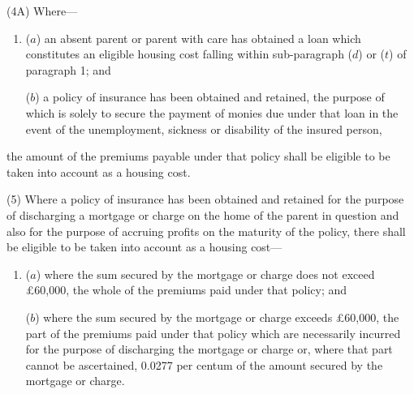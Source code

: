 \documentclass[12pt,a4paper]{article}
\begin{document}
(4A) Where—
\begin{enumerate}\item[]
($a$) an absent parent or parent with care has obtained a loan which constitutes an eligible housing cost falling within sub-paragraph ($d$) or ($t$) of paragraph 1; and

($b$) a policy of insurance has been obtained and retained, the purpose of which is solely to secure the payment of monies due under that loan in the event of the unemployment, sickness or disability of the insured person,
\end{enumerate}
the amount of the premiums payable under that policy shall be eligible to be taken into account as a housing cost.


(5) Where a policy of insurance has been obtained and retained for the purpose of discharging a mortgage or charge on the home of the parent in question and also for the purpose of accruing profits on the maturity of the policy, there shall be eligible to be taken into account as a housing cost—
\begin{enumerate}\item[]
($a$) where the sum secured by the mortgage or charge does not exceed £60,000, the whole of the premiums paid under that policy; and

($b$) where the sum secured by the mortgage or charge exceeds £60,000, the part of the premiums paid under that policy which are necessarily incurred for the purpose of discharging the mortgage or charge or, where that part cannot be ascertained, 0.0277 per centum of the amount secured by the mortgage or charge.
\end{enumerate}
\end{document}
